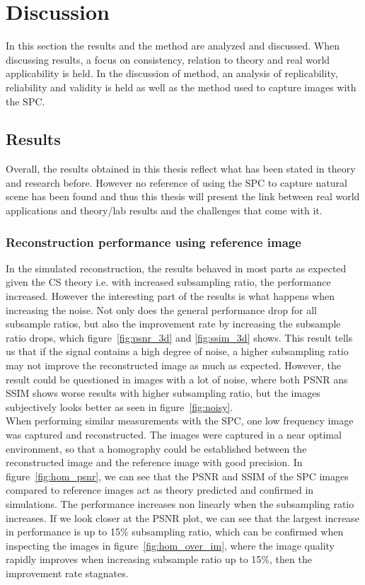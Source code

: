 \chapter{Discussion} %
\label{sec:discussion}
In this section the results and the method are analyzed and discussed. When discussing results, a focus on consistency, relation to theory and real world applicability is held. In the discussion of method, an analysis of replicability, reliability and  validity is held as well as the method used to capture images with the SPC.

\section{Results} 
Overall, the results obtained in this thesis reflect what has been stated in theory and research before. However no reference of using the SPC to capture natural scene has been found and thus this thesis will present the link between real world applications and theory/lab results and the challenges that come with it. 



\subsection{Reconstruction performance using reference image}
\label{sec:anlys_ref_im}

In the simulated reconstruction, the results behaved in most parts as expected given the CS theory i.e. with increased subsampling ratio, the performance increased. However the interesting part of the results is what happens when increasing the noise. Not only does the general performance drop for all subsample ratios, but also the improvement rate by increasing the subsample ratio drops, which figure~\ref{fig:psnr_3d} and \ref{fig:ssim_3d} shows. This result tells us that if the signal contains a high degree of noise, a higher subsampling ratio may not improve the reconstructed image as much as expected. However, the result could be questioned in images with a lot of noise, where both PSNR ans SSIM shows worse results with higher subsampling ratio, but the images subjectively looks better as seen in figure~\ref{fig:noisy}.\\[0.1in]

When performing similar measurements with the SPC, one low frequency image was captured and reconstructed. The images were captured in a near optimal environment, so that a homography could be established between the reconstructed image and the reference image with good precision. In figure~\ref{fig:hom_psnr}, we can see that the PSNR and SSIM of the SPC images compared to reference images act as theory predicted and confirmed in simulations. The performance increases non linearly when the subsampling ratio increases. If we look closer at the PSNR plot, we can see that the largest increase in performance is up to 15\% subsampling ratio, which can be confirmed when inspecting the images in figure~\ref{fig:hom_over_im}, where the image quality rapidly improves when increasing subsample ratio up to 15\%, then the improvement rate stagnates.


